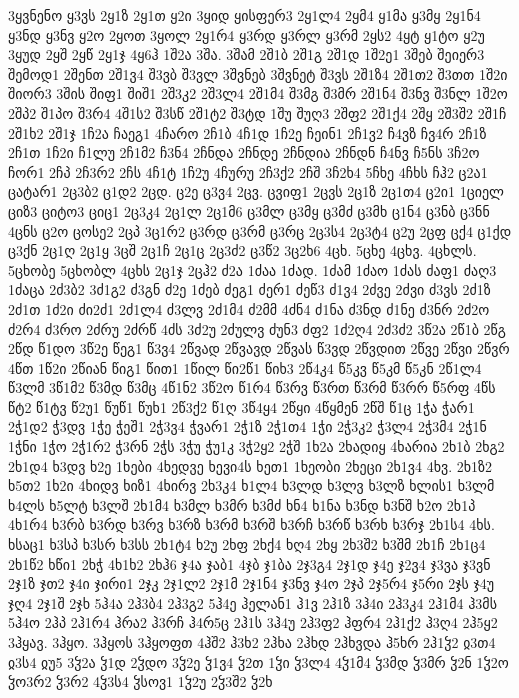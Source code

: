 {3ყვნენო
ყ3ვს
2ყ1ზ
2ყ1თ
ყ2ი
3ყიდ
ყისფერ3
2ყ1ლ4
2ყმ4
ყ1მა
ყ3მყ
2ყ1ნ4
ყ3ნდ
ყ3ნვ
ყ2ო
2ყოთ
3ყოლ
2ყ1რ4
ყ3რდ
ყ3რლ
ყ3რმ
2ყს2
4ყტ
ყ1ტო
ყ2უ
3ყუდ
2ყშ
2ყწ
2ყ1ჯ
4ყ6ჰ
1შ2ა
3შა.
3შამ
2შ1ბ
2შ1გ
2შ1დ
1შ2ე1
3შებ
შეიერ3
შემოდ1
2შენთ
2შ1ვ4
შ3ვბ
შ3ვლ
3შვნებ
3შვნეტ
შ3ვს
2შ1ზ4
2შ1თ2
შ3თთ
1შ2ი
შიორ3
3შის
შიფ1
შიშ1
2შ3კ2
2შ3ლ4
2შ1მ4
შ3მგ
შ3მრ
2შ1ნ4
შ3ნვ
შ3ნლ
1შ2ო
2შპ2
შ1პო
შ3რ4
4შ1ს2
შ3სწ
2შ1ტ2
შ3ტდ
1შუ
შუღ3
2შფ2
2შ1ქ4
2შყ
2შ3შ2
2შ1ჩ
2შ1ხ2
2შ1ჯ
1ჩ2ა
ჩაეგ1
4ჩარო
2ჩ1ბ
4ჩ1დ
1ჩ2ე
ჩეინ1
2ჩ1ვ2
ჩ4ვზ
ჩვ4რ
2ჩ1ზ
2ჩ1თ
1ჩ2ი
ჩ1ლუ
2ჩ1მ2
ჩ3ნ4
2ჩნდა
2ჩნდე
2ჩნდია
2ჩნდნ
ჩ4ნვ
ჩ5ნს
3ჩ2ო
ჩორ1
2ჩპ
2ჩ3რ2
2ჩს
4ჩ1ტ
1ჩ2უ
4ჩურუ
2ჩ3ქ2
2ჩშ
3ჩ2ხ4
5ჩხე
4ჩხს
ჩჰ2
ც2ა1
ცატარ1
2ც3ბ2
ც1დ2
2ცდ.
ც2ე
ც3ვ4
2ცვ.
ცვიფ1
2ცვს
2ც1ზ
2ც1თ4
ც2ი1
1ციელ
ციზ3
ციტო3
ციც1
2ც3კ4
2ც1ლ
2ც1მ6
ც3მლ
ც3მყ
ც3მძ
ც3მხ
ც1ნ4
ც3ნბ
ც3ნნ
4ცნს
ც2ო
ცოსე2
2ცპ
3ც1რ2
ც3რდ
ც3რმ
ც3რც
2ც3ს4
2ც3ტ4
ც2უ
2ცფ
ცქ4
ც1ქდ
ც3ქნ
2ც1ღ
2ც1ყ
3ცშ
2ც1ჩ
2ც1ც
2ც3ძ2
ც3წ2
3ც2ხ6
4ცხ.
5ცხე
4ცხვ.
4ცხლს.
5ცხობე
5ცხობლ
4ცხს
2ც1ჯ
2ცჰ2
ძ2ა
1ძაა
1ძად.
1ძამ
1ძაო
1ძას
ძაფ1
ძაღ3
1ძაცა
2ძ3ბ2
3ძ1გ2
ძ3გნ
ძ2ე
1ძებ
ძეგ1
ძერ1
ძეწ3
ძ1ვ4
2ძვე
2ძვი
ძ3ვს
2ძ1ზ
2ძ1თ
1ძ2ი
ძი2ძ1
2ძ1ლ4
ძ3ლვ
2ძ1მ4
ძ2მმ
4ძნ4
ძ1ნა
ძ3ნდ
ძ1ნე
ძ3ნრ
2ძ2ო
ძ2რ4
ძ3რო
2ძრუ
2ძრწ
4ძს
3ძ2უ
2ძულვ
ძუნ3
ძფ2
1ძ2ღ4
2ძ3ძ2
3წ2ა
2წ1ბ
2წგ
2წდ
წ1დო
3წ2ე
წეგ1
წ3ვ4
2წვად
2წვავდ
2წვას
წ3ვდ
2წვდით
2წვე
2წვი
2წვრ
4წთ
1წ2ი
2წიან
წიგ1
წით1
1წილ
წი2წ1
წიხ3
2წ4კ4
წ5კვ
წ5კმ
წ5კნ
2წ1ლ4
წ3ლმ
3წ1მ2
წ3მდ
წ3მც
4წ1ნ2
3წ2ო
წ1რ4
წ3რვ
წ3რთ
წ3რმ
წ3რრ
წ5რფ
4წს
წტ2
წ1ტვ
წ2უ1
წუწ1
წუხ1
2წ3ქ2
წ1ღ
3წ4ყ4
2წყი
4წყმენ
2წშ
წ1ც
1ჭა
ჭარ1
2ჭ1დ2
ჭ3დვ
1ჭე
ჭეშ1
2ჭ3ვ4
ჭვარ1
2ჭ1ზ
2ჭ1თ4
1ჭი
2ჭ3კ2
ჭ3ლ4
2ჭ3მ4
2ჭ1ნ
1ჭნი
1ჭო
2ჭ1რ2
ჭ3რნ
2ჭს
3ჭუ
ჭუ1კ
3ჭ2ყ2
2ჭშ
1ხ2ა
2ხადიყ
4ხარია
2ხ1ბ
2ხგ2
2ხ1დ4
ხ3დვ
ხ2ე
1ხები
4ხედვე
ხევი4ს
ხეთ1
1ხეობი
2ხეცი
2ხ1ვ4
4ხვ.
2ხ1ზ2
ხ5თ2
1ხ2ი
4ხიდვ
ხიზ1
4ხირვ
2ხ3კ4
ხ1ლ4
ხ3ლდ
ხ3ლვ
ხ3ლზ
ხლის1
ხ3ლმ
ხ4ლს
ხ5ლტ
ხ3ლშ
2ხ1მ4
ხ3მლ
ხ3მრ
ხ3მძ
ხნ4
ხ1ნა
ხ3ნდ
ხ3ნშ
ხ2ო
2ხ1პ
4ხ1რ4
ხ3რბ
ხ3რდ
ხ3რვ
ხ3რზ
ხ3რმ
ხ3რშ
ხ3რჩ
ხ3რწ
ხ3რხ
ხ3რჯ
2ხ1ს4
4ხს.
ხსაც1
ხ3სპ
ხ3სრ
ხ3სს
2ხ1ტ4
ხ2უ
2ხფ
2ხქ4
ხღ4
2ხყ
2ხ3შ2
ხ3შმ
2ხ1ჩ
2ხ1ც4
2ხ1წ2
ხწი1
2ხჭ
4ხ1ხ2
2ხჰ6
ჯ4ა
ჯაბ1
4ჯბ
ჯ1ბა
2ჯ3გ4
2ჯ1დ
ჯ4ე
ჯ2ვ4
ჯ3ვა
ჯ3ვნ
2ჯ1ზ
ჯთ2
ჯ4ი
ჯირი1
2ჯკ
2ჯ1ლ2
2ჯ1მ
2ჯ1ნ4
ჯ3ნვ
ჯ4ო
2ჯპ
2ჯ5რ4
ჯ5რი
2ჯს
ჯ4უ
ჯღ4
2ჯ1შ
2ჯხ
5ჰ4ა
2ჰ3ბ4
2ჰ3გ2
5ჰ4ე
ჰელან1
ჰ1ვ
2ჰ1ზ
3ჰ4ი
2ჰ3კ4
2ჰ1მ4
ჰ3მს
5ჰ4ო
2ჰპ
2ჰ1რ4
ჰრა2
ჰ3რჩ
ჰ4რ5ც
2ჰ1ს
3ჰ4უ
2ჰ3ფ2
ჰფრ4
2ჰ1ქ2
ჰ3ღ4
2ჰ5ყ2
3ჰყავ.
3ჰყო.
3ჰყოს
3ჰყოფთ
4ჰშ2
ჰ3ხ2
2ჰხა
2ჰხდ
2ჰხვდა
ჰ5ხრ
2ჰ1ჴ2
ჲ3თ4
ჲ3ს4
ჲუ5
3ჴ2ა
ჴ1დ
2ჴდო
3ჴ2ე
ჴ1ვ4
ჴ2თ
1ჴი
ჴ3ლ4
4ჴ1მ4
ჴ3მდ
ჴ3მრ
ჴ2ნ
1ჴ2ო
ჴო3რ2
ჴ3რ2
4ჴ3ს4
ჴსოვ1
1ჴ2უ
2ჴ3შ2
ჴ2ხ
}
